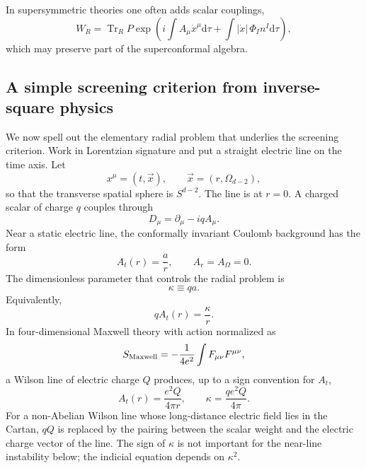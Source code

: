 \documentclass[11pt]{article}
\newcommand{\dd}{\mathrm{d}}
\newcommand{\defeq}{\equiv}
\begin{document}
In supersymmetric theories one often adds scalar couplings,
\begin{equation}
  W_R=\operatorname{Tr}_R P\exp\left(i\int A_\mu\dot x^\mu\dd\tau+\int |\dot x|\,\Phi_I n^I\dd\tau\right),
\end{equation}
which may preserve part of the superconformal algebra.

\subsection{A simple screening criterion from inverse-square physics}

We now spell out the elementary radial problem that underlies the screening criterion.  Work in Lorentzian signature and put a straight electric line on the time axis.  Let
\begin{equation}
  x^\mu=(t,\vec x),
  \qquad
  \vec x=(r,\Omega_{d-2}),
\end{equation}
so that the transverse spatial sphere is $S^{d-2}$.  The line is at $r=0$.  A charged scalar of charge $q$ couples through
\begin{equation}
  D_\mu=\partial_\mu-iq A_\mu .
\end{equation}
Near a static electric line, the conformally invariant Coulomb background has the form
\begin{equation}
  A_t(r)=\frac{a}{r},
  \qquad
  A_r=A_\Omega=0 .
\end{equation}
The dimensionless parameter that controls the radial problem is
\begin{equation}
  \kappa\defeq q a .
  \label{eq:kappaDefinitionWilsonLine}
\end{equation}
Equivalently,
\begin{equation}
  q A_t(r)=\frac{\kappa}{r} .
\end{equation}
In four-dimensional Maxwell theory with action normalized as
\begin{equation}
  S_{\rm Maxwell}=-\frac{1}{4e^2}\int F_{\mu\nu}F^{\mu\nu},
\end{equation}
a Wilson line of electric charge $Q$ produces, up to a sign convention for $A_t$,
\begin{equation}
  A_t(r)=\frac{e^2 Q}{4\pi r},
  \qquad
  \kappa=\frac{q e^2 Q}{4\pi} .
  \label{eq:kappaQED4}
\end{equation}
For a non-Abelian Wilson line whose long-distance electric field lies in the Cartan, $qQ$ is replaced by the pairing between the scalar weight and the electric charge vector of the line.  The sign of $\kappa$ is not important for the near-line instability below; the indicial equation depends on $\kappa^2$.
\end{document}

